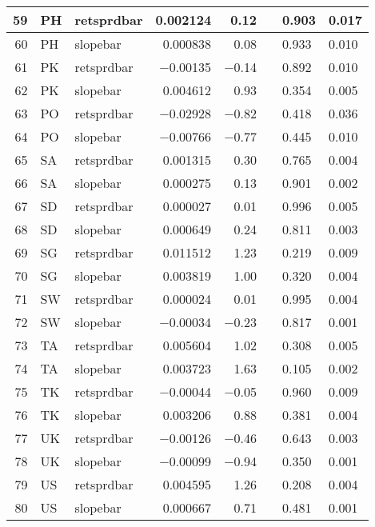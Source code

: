 \begin{longtable}{|r|l|l|r|r|l|l|l|}
   59 &    PH &    retsprdbar &    0.002124 &    0.12 &      &    0.903 &    0.017\\\hline
   60 &    PH &    slopebar &    0.000838 &    0.08 &      &    0.933 &    0.010\\\hline
   61 &    PK &    retsprdbar &    $-$0.00135 &    $-$0.14 &      &    0.892 &    0.010\\\hline
   62 &    PK &    slopebar &    0.004612 &    0.93 &      &    0.354 &    0.005\\\hline
   63 &    PO &    retsprdbar &    $-$0.02928 &    $-$0.82 &      &    0.418 &    0.036\\\hline
   64 &    PO &    slopebar &    $-$0.00766 &    $-$0.77 &      &    0.445 &    0.010\\\hline
   65 &    SA &    retsprdbar &    0.001315 &    0.30 &      &    0.765 &    0.004\\\hline
   66 &    SA &    slopebar &    0.000275 &    0.13 &      &    0.901 &    0.002\\\hline
   67 &    SD &    retsprdbar &    0.000027 &    0.01 &      &    0.996 &    0.005\\\hline
   68 &    SD &    slopebar &    0.000649 &    0.24 &      &    0.811 &    0.003\\\hline
   69 &    SG &    retsprdbar &    0.011512 &    1.23 &      &    0.219 &    0.009\\\hline
   70 &    SG &    slopebar &    0.003819 &    1.00 &      &    0.320 &    0.004\\\hline
   71 &    SW &    retsprdbar &    0.000024 &    0.01 &      &    0.995 &    0.004\\\hline
   72 &    SW &    slopebar &    $-$0.00034 &    $-$0.23 &      &    0.817 &    0.001\\\hline
   73 &    TA &    retsprdbar &    0.005604 &    1.02 &      &    0.308 &    0.005\\\hline
   74 &    TA &    slopebar &    0.003723 &    1.63 &      &    0.105 &    0.002\\\hline
   75 &    TK &    retsprdbar &    $-$0.00044 &    $-$0.05 &      &    0.960 &    0.009\\\hline
   76 &    TK &    slopebar &    0.003206 &    0.88 &      &    0.381 &    0.004\\\hline
   77 &    UK &    retsprdbar &    $-$0.00126 &    $-$0.46 &      &    0.643 &    0.003\\\hline
   78 &    UK &    slopebar &    $-$0.00099 &    $-$0.94 &      &    0.350 &    0.001\\\hline
   79 &    US &    retsprdbar &    0.004595 &    1.26 &      &    0.208 &    0.004\\\hline
   80 &    US &    slopebar &    0.000667 &    0.71 &      &    0.481 &    0.001\\\hline
\end{longtable}

